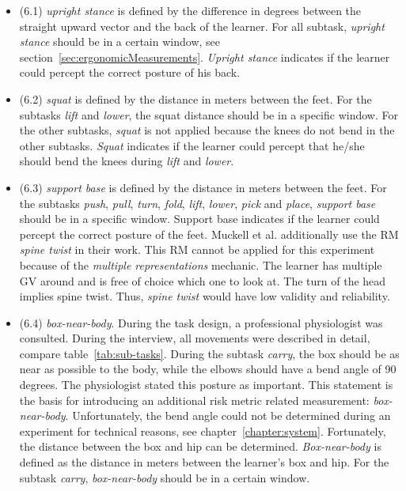\begin{itemize}
	\item[] (6.1) \textit{upright stance} is defined by the difference in degrees between the straight upward vector and the back of the learner. For all subtask, \textit{upright stance} should be in a certain window, see section~\ref{sec:ergonomicMeasurements}. \textit{Upright stance} indicates if the learner could percept the correct posture of his back.
	
	\item[] (6.2) \textit{squat} is defined by the distance in meters between the feet. For the subtasks \textit{lift} and \textit{lower}, the squat distance should be in a specific window. For the other subtasks, \textit{squat} is not applied because the knees do not bend in the other subtasks. \textit{Squat} indicates if the learner could percept that he/she should bend the knees during \textit{lift} and \textit{lower}.
	
	\item[] (6.3) \textit{support base} is defined by the distance in meters between the feet. For the subtasks \textit{push}, \textit{pull}, \textit{turn}, \textit{fold}, \textit{lift}, \textit{lower}, \textit{pick} and \textit{place}, \textit{support base} should be in a specific window. Support base indicates if the learner could percept the correct posture of the feet.
	Muckell et al.\cite{muckell} additionally use the RM \textit{spine twist} in their work. This RM cannot be applied for this experiment because of the \textit{multiple representations} mechanic. The learner has multiple GV around and is free of choice which one to look at. The turn of the head implies spine twist. Thus, \textit{spine twist} would have low validity and reliability.
	
	\item[] (6.4) \textit{box-near-body}. During the task design, a professional physiologist was consulted. During the interview, all movements were described in detail, compare table~\ref{tab:sub-tasks}. During the subtask \textit{carry}, the box should be as near as possible to the body, while the elbows should have a bend angle of 90 degrees. The physiologist stated this posture as important. This statement is the basis for introducing an additional risk metric related measurement: \textit{box-near-body}. Unfortunately, the bend angle could not be determined during an experiment for technical reasons, see chapter~\ref{chapter:system}. Fortunately, the distance between the box and hip can be determined. \textit{Box-near-body} is defined as the distance in meters between the learner's box and hip. For the subtask \textit{carry}, \textit{box-near-body} should be in a certain window.
\end{itemize}

